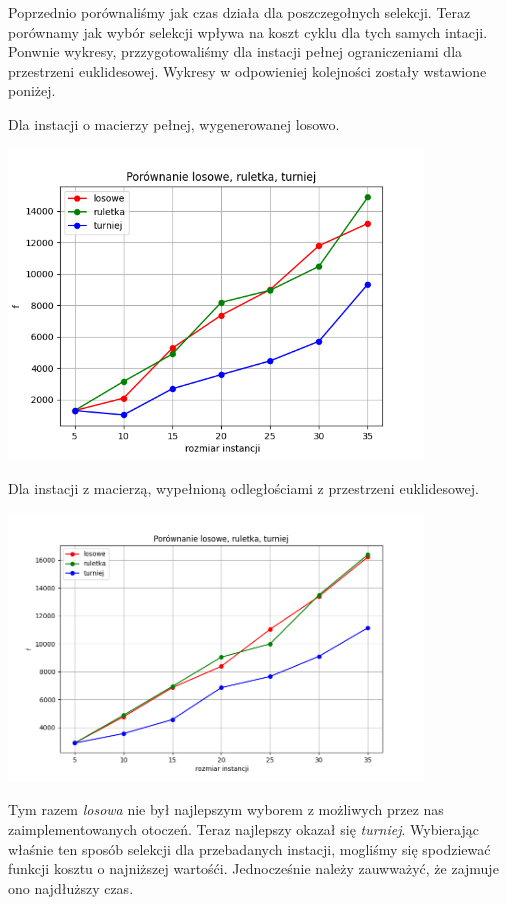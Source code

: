 \documentclass{article}
\begin{document}
    Poprzednio porównaliśmy jak czas działa dla poszczegołnych selekcji. Teraz
    porównamy jak wybór selekcji wpływa na koszt cyklu dla tych samych
    intacji. Ponwnie wykresy, przzygotowaliśmy dla instacji pełnej ograniczeniami
    dla przestrzeni euklidesowej. Wykresy w odpowieniej kolejności zostały
    wstawione poniżej.

    Dla instacji o macierzy pełnej, wygenerowanej losowo.

    \includegraphics[width=11cm]{../spr3img/Figure_1FULL.png}

    Dla instacji z macierzą, wypełnioną odległościami z przestrzeni
    euklidesowej.

    \includegraphics[width=11cm]{../spr3img/Figure_1.png}

    Tym razem \emph{losowa} nie był najlepszym wyborem z możliwych przez nas
    zaimplementowanych otoczeń. Teraz najlepszy okazał się \emph{turniej}.
    Wybierając właśnie ten sposób selekcji dla przebadanych instacji, mogliśmy się
    spodziewać funkcji kosztu o najniższej wartośći. Jednocześnie należy zauwważyć,
    że zajmuje ono najdłuższy czas.
\end{document}
